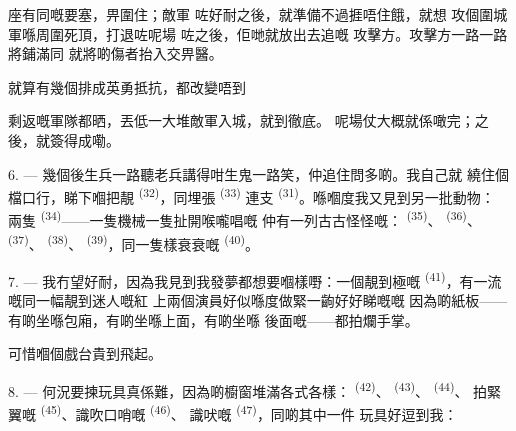 座有同嘅要塞，畀圍住；敵軍
咗好耐之後，就準備不過捱唔住餓，就想
攻個圍城軍喺周圍死頂，打退咗呢場
咗之後，佢哋就放出去追嘅
攻擊方。攻擊方一路一路將鋪滿同
就將啲傷者抬入交畀醫。

就算有幾個排成英勇抵抗，都改變唔到

剩返嘅軍隊都晒，丟低一大堆敵軍入城，就到徹底。
呢場仗大概就係噉完；之後，就簽得成嘞。

\VUsaut{4.4mm}
\VUsaut{2.8mm}

6. --- 幾個後生兵一路聽老兵講得咁生鬼一路笑，仲追住問多啲。我自己就
繞住個檔口行，睇下嗰把靚 \textsuperscript{(32)}，同埋張
\textsuperscript{(33)} 連支 \textsuperscript{(31)}。喺嗰度我又見到另一批動物：
兩隻 \textsuperscript{(34)}——一隻機械一隻扯開喉嚨唱嘅
仲有一列古古怪怪嘅： \textsuperscript{(35)}、
\textsuperscript{(36)}、 \textsuperscript{(37)}、 \textsuperscript{(38)}、
 \textsuperscript{(39)}，同一隻樣衰衰嘅 \textsuperscript{(40)}。

7. --- 我冇望好耐，因為我見到我發夢都想要嗰樣嘢：一個靚到極嘅
 \textsuperscript{(41)}，有一流嘅同一幅靚到迷人嘅紅
上兩個演員好似喺度做緊一齣好好睇嘅嘅
因為啲紙板——有啲坐喺包廂，有啲坐喺上面，有啲坐喺
後面嘅——都拍爛手掌。

可惜嗰個戲台貴到飛起。

8. --- 何況要揀玩具真係難，因為啲櫥窗堆滿各式各樣：
\textsuperscript{(42)}、 \textsuperscript{(43)}、 \textsuperscript{(44)}、
拍緊翼嘅 \textsuperscript{(45)}、識吹口哨嘅 \textsuperscript{(46)}、
識吠嘅 \textsuperscript{(47)}，同啲其中一件
玩具好逗到我：


